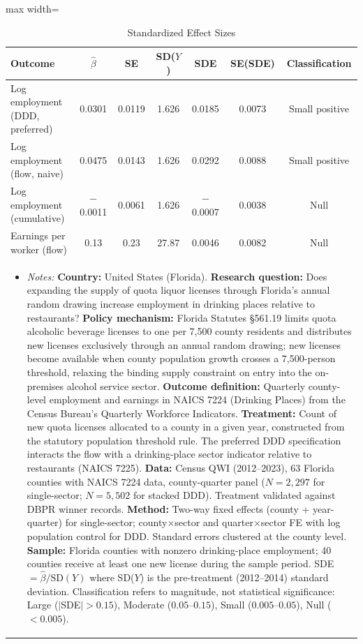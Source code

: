 \begin{table}[htbp]
\centering
\caption{Standardized Effect Sizes}
\label{tab:sde}
\begin{adjustbox}{max width=\textwidth}
\begin{tabular}{lcccccc}
\hline\hline
Outcome & $\hat{\beta}$ & SE & SD($Y$) & SDE & SE(SDE) & Classification \\
\hline
Log employment (DDD, preferred) & 0.0301 & 0.0119 & 1.626 & 0.0185 & 0.0073 & Small positive \\
Log employment (flow, naive) & 0.0475 & 0.0143 & 1.626 & 0.0292 & 0.0088 & Small positive \\
Log employment (cumulative) & $-$0.0011 & 0.0061 & 1.626 & $-$0.0007 & 0.0038 & Null \\
Earnings per worker (flow) & 0.13 & 0.23 & 27.87 & 0.0046 & 0.0082 & Null \\
\hline\hline
\multicolumn{7}{p{0.95\textwidth}}{\footnotesize \begin{itemize}[leftmargin=*,nosep] \item \textit{Notes:} \textbf{Country:} United States (Florida). \textbf{Research question:} Does expanding the supply of quota liquor licenses through Florida's annual random drawing increase employment in drinking places relative to restaurants? \textbf{Policy mechanism:} Florida Statutes \S561.19 limits quota alcoholic beverage licenses to one per 7,500 county residents and distributes new licenses exclusively through an annual random drawing; new licenses become available when county population growth crosses a 7,500-person threshold, relaxing the binding supply constraint on entry into the on-premises alcohol service sector. \textbf{Outcome definition:} Quarterly county-level employment and earnings in NAICS 7224 (Drinking Places) from the Census Bureau's Quarterly Workforce Indicators. \textbf{Treatment:} Count of new quota licenses allocated to a county in a given year, constructed from the statutory population threshold rule. The preferred DDD specification interacts the flow with a drinking-place sector indicator relative to restaurants (NAICS 7225). \textbf{Data:} Census QWI (2012--2023), 63 Florida counties with NAICS 7224 data, county-quarter panel ($N = 2{,}297$ for single-sector; $N = 5{,}502$ for stacked DDD). Treatment validated against DBPR winner records. \textbf{Method:} Two-way fixed effects (county + year-quarter) for single-sector; county$\times$sector and quarter$\times$sector FE with log population control for DDD. Standard errors clustered at the county level. \textbf{Sample:} Florida counties with nonzero drinking-place employment; 40 counties receive at least one new license during the sample period. SDE $= \hat{\beta} / \text{SD}(Y)$ where SD($Y$) is the pre-treatment (2012--2014) standard deviation. Classification refers to magnitude, not statistical significance: Large ($|$SDE$| > 0.15$), Moderate ($0.05$--$0.15$), Small ($0.005$--$0.05$), Null ($< 0.005$). \end{itemize}}
\end{tabular}
\end{adjustbox}
\end{table}

